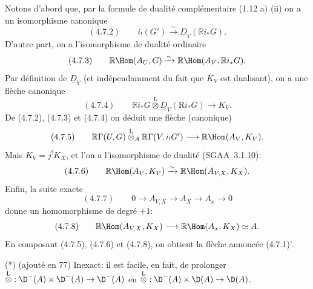 Notons d'abord que, par la formule de dualité complémentaire (1.12 a) (ii) on a un isomorphisme canonique
\[
(4.7.2)\qquad i_!(G')\xrightarrow{\sim}\underline{D}_V(\mathbb{R} i_*G).
\]
D'autre part, on a l'isomorphisme de dualité ordinaire
\[
(4.7.3)\qquad \mathbb{R}\Hom(A_U,G)\xrightarrow{\sim}\mathbb{R}\Hom(A_V,\mathbb{R} i_*G).
\]
Par définition de $\underline{D}_V$ (et indépendamment du fait que $K_V$ est dualisant), on a une flèche canonique
\[
(4.7.4)\qquad \mathbb{R} i_*G\overset{\mathrm{L}}{\otimes}\underline{D}_V(\mathrm{R} i_*G)\longrightarrow K_V.
\]
De (4.7.2), (4.7.3) et (4.7.4) on déduit une flèche (canonique)
\[
(4.7.5)\qquad \mathbb{R}\Gamma(U,G)\overset{\mathrm{L}}{\otimes}_A\mathbb{R}\Gamma(V,i_!G')\longrightarrow \mathbb{R}\Hom(A_V,K_V).
\]
Mais $K_V=j^{!}K_X$, et l'on a l'isomorphisme de dualité (SGAA~3.1.10):
\[
(4.7.6)\qquad \mathbb{R}\Hom(A_V,K_V)\xrightarrow{\sim}\mathbb{R}\Hom(A_{V,X},K_X).
\]
Enfin, la suite exacte
\[
(4.7.7)\qquad 0\longrightarrow A_{V,X}\longrightarrow A_X\longrightarrow A_x\longrightarrow 0
\]
donne un homomorphisme de degré $+1$:
\[
(4.7.8)\qquad \mathbb{R}\Hom(A_{V,X},K_X)\longrightarrow \mathbb{R}\Hom(A_x,K_X)\simeq A.
\]
En composant (4.7.5), (4.7.6) et (4.7.8), on obtient la flèche annoncée (4.7.1)'.

(*) (ajouté en 77) Inexact: il est facile, en fait, de prolonger $\overset{\mathrm{L}}{\otimes}:\D^-(A)\times\D^-(A)\to\D^-(A)$ en $\overset{\mathrm{L}}{\otimes}:\D^-(A)\times\D(A)\to\D(A)$.

